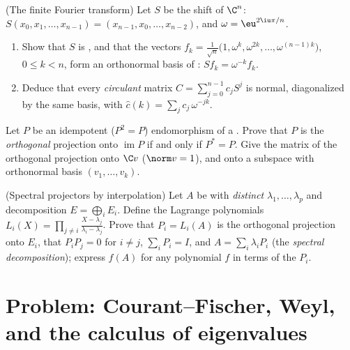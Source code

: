 \begin{exercise}[$\star\star$]\label{exo:b2:hermitian:10}
(The finite Fourier transform) Let $S$ be the  shift of
$\C^n$: $S(x_0, x_1, \dots, x_{n-1}) = (x_{n-1}, x_0, \dots,
x_{n-2})$, and $\omega = \eu^{2\iu\pi/n}$.
\begin{enumerate}
  \item Show that $S$ is , and that the vectors $f_k =
        \frac{1}{\sqrt n}\bigl(1, \omega^k, \omega^{2k}, \dots,
        \omega^{(n-1)k}\bigr)$, $0 \leq k < n$, form an
        orthonormal basis of : $Sf_k = \omega^{-k}
        f_k$.
  \item Deduce that every \emph{circulant} matrix $C =
        \sum_{j=0}^{n-1} c_jS^j$ is normal, diagonalized by the
        same basis, with  $\widehat c(k) = \sum_j
        c_j\,\omega^{-jk}$.
\end{enumerate}
\end{exercise}

\begin{exercise}[$\star\star$]\label{exo:b2:hermitian:11}
Let $P$ be an idempotent ($P^2 = P$) endomorphism of a . Prove that $P$ is the \emph{orthogonal} projection onto
$\operatorname{im} P$ if and only if $P^* = P$. Give the matrix
of the orthogonal projection onto $\C v$ ($\norm v = 1$), and
onto a subspace with orthonormal basis $(v_1, \dots, v_k)$.
\end{exercise}

\begin{exercise}[$\star\star\star$]\label{exo:b2:hermitian:12}
(Spectral projectors by interpolation) Let $A$ be  with
\emph{distinct}  $\lambda_1, \dots, \lambda_p$ and
 decomposition $E = \bigoplus_i E_i$. Define the
Lagrange polynomials $L_i(X) = \prod_{j\neq i}\frac{X -
\lambda_j}{\lambda_i - \lambda_j}$. Prove that $P_i = L_i(A)$
is the orthogonal projection onto $E_i$, that $P_iP_j = 0$ for
$i \neq j$, $\sum_i P_i = I$, and $A = \sum_i \lambda_iP_i$
(the \emph{spectral decomposition}); express $f(A)$ for any
polynomial $f$ in terms of the $P_i$.
\end{exercise}

\section{Problem: Courant--Fischer, Weyl, and the calculus of
eigenvalues}

